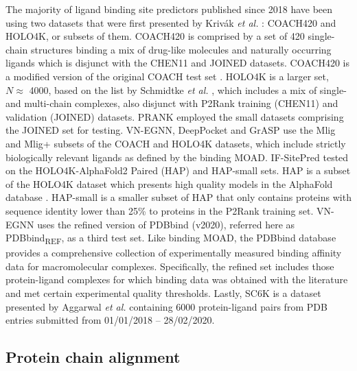 The majority of ligand binding site predictors published since 2018 have been using two datasets that were first presented by Krivák \textit{et al.} \cite{KRIVAK_2018_P2RANK}: COACH420 and HOLO4K, or subsets of them. COACH420 is comprised by a set of 420 single-chain structures binding a mix of drug-like molecules and naturally occurring ligands which is disjunct with the CHEN11 and JOINED datasets. COACH420 is a modified version of the original COACH test set \cite{ROY_2012_COFACTOR, YANG_2013_COFACTOR}. HOLO4K is a larger set, $N \approx$ 4000, based on the list by Schmidtke \textit{et al.} \cite{SCHMIDTKE_2010_BENCHMARK}, which includes a mix of single- and multi-chain complexes, also disjunct with P2Rank training (CHEN11) and validation (JOINED) datasets. PRANK employed the small datasets comprising the JOINED set for testing. VN-EGNN, DeepPocket and GrASP use the Mlig and Mlig+ subsets of the COACH and HOLO4K datasets, which include strictly biologically relevant ligands as defined by the binding MOAD. IF-SitePred tested on the HOLO4K-AlphaFold2 Paired (HAP) and HAP-small sets. HAP is a subset of the HOLO4K dataset which presents high quality models in the AlphaFold database \cite{VARADI_2022_ALPHAFOLDDB}. HAP-small is a smaller subset of HAP that only contains proteins with sequence identity lower than 25\% to proteins in the P2Rank training set. VN-EGNN uses the refined version of PDBbind (v2020), referred here as PDBbind\textsubscript{REF}, \cite{WANG_2004_PDBBIND, WANG_2005_PDBBIND, CHENG_2009_PDBBIND, LI_2014_PDBBIND, LIU_2015_PDBBIND, LIU_2017_PDBBIND} as a third test set. Like binding MOAD, the PDBbind database provides a comprehensive collection of experimentally measured binding affinity data for macromolecular complexes. Specifically, the refined set includes those protein-ligand complexes for which binding data was obtained with the literature and met certain experimental quality thresholds. Lastly, SC6K is a dataset presented by Aggarwal \textit{et al.} \cite{AGGARWAL_2022_DEEPPOCKET} containing 6000 protein-ligand pairs from PDB entries submitted from 01/01/2018 – 28/02/2020.

\subsection{Protein chain alignment}

